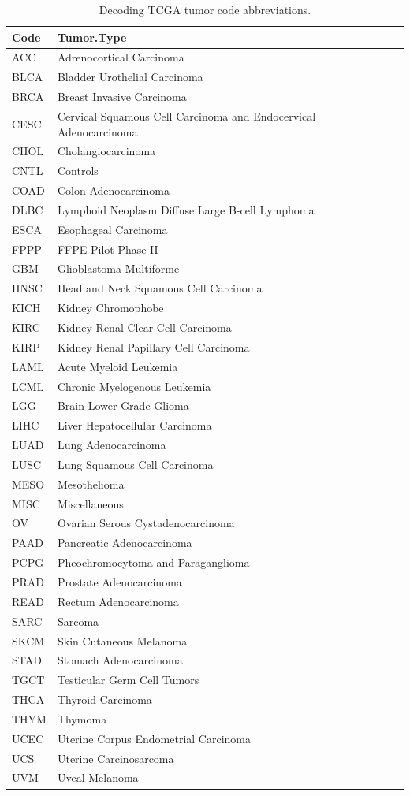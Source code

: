 \documentclass[]{article}
\begin{document}
\begin{table}

\caption{\label{tab:tab-deco}Decoding TCGA tumor code abbreviations.}
\centering
\begin{tabular}[t]{ll}
\toprule
Code & Tumor.Type\\
\midrule
ACC & Adrenocortical Carcinoma\\
BLCA & Bladder Urothelial Carcinoma\\
BRCA & Breast Invasive Carcinoma\\
CESC & Cervical Squamous Cell Carcinoma and Endocervical Adenocarcinoma\\
CHOL & Cholangiocarcinoma\\
\addlinespace
CNTL & Controls\\
COAD & Colon Adenocarcinoma\\
DLBC & Lymphoid Neoplasm Diffuse Large B-cell Lymphoma\\
ESCA & Esophageal Carcinoma\\
FPPP & FFPE Pilot Phase II\\
\addlinespace
GBM & Glioblastoma Multiforme\\
HNSC & Head and Neck Squamous Cell Carcinoma\\
KICH & Kidney Chromophobe\\
KIRC & Kidney Renal Clear Cell Carcinoma\\
KIRP & Kidney Renal Papillary Cell Carcinoma\\
\addlinespace
LAML & Acute Myeloid Leukemia\\
LCML & Chronic Myelogenous Leukemia\\
LGG & Brain Lower Grade Glioma\\
LIHC & Liver Hepatocellular Carcinoma\\
LUAD & Lung Adenocarcinoma\\
\addlinespace
LUSC & Lung Squamous Cell Carcinoma\\
MESO & Mesothelioma\\
MISC & Miscellaneous\\
OV & Ovarian Serous Cystadenocarcinoma\\
PAAD & Pancreatic Adenocarcinoma\\
\addlinespace
PCPG & Pheochromocytoma and Paraganglioma\\
PRAD & Prostate Adenocarcinoma\\
READ & Rectum Adenocarcinoma\\
SARC & Sarcoma\\
SKCM & Skin Cutaneous Melanoma\\
\addlinespace
STAD & Stomach Adenocarcinoma\\
TGCT & Testicular Germ Cell Tumors\\
THCA & Thyroid Carcinoma\\
THYM & Thymoma\\
UCEC & Uterine Corpus Endometrial Carcinoma\\
\addlinespace
UCS & Uterine Carcinosarcoma\\
UVM & Uveal Melanoma\\
\bottomrule
\end{tabular}
\end{table}
\end{document}
